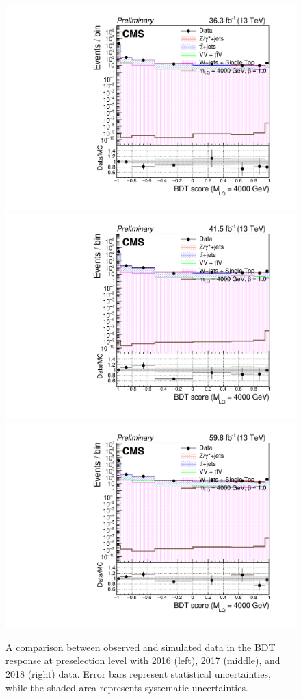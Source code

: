 \begin{figure}[H]
    {\includegraphics[width=.32\textwidth]{Images/Analysis/Results_2016_Unblinded/Plots/Preselection/BasicLQ_uujj_LQToBMu_pair_uubj_BDT_discrim_M4000_standard.pdf}}
    {\includegraphics[width=.32\textwidth]{Images/Analysis/Results_2017_Unblinded/Plots/Preselection/BasicLQ_uujj_LQToBMu_pair_uubj_BDT_discrim_M4000_standard.pdf}}
    {\includegraphics[width=.32\textwidth]{Images/Analysis/Results_2018_Unblinded/Plots/Preselection/BasicLQ_uujj_LQToBMu_pair_uubj_BDT_discrim_M4000_standard.pdf}}
    \caption{A comparison between observed and simulated data in the BDT response at preselection level with 2016 (left), 2017 (middle), and 2018 (right) data. Error bars represent statistical uncertainties, while the shaded area represents systematic uncertainties.}
    \label{figapp:BDT3000to4000}
\end{figure}